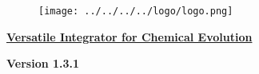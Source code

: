 
\begin{center}
\begin{figure}[!h]
\centering
\texttt{[image: ../../../../logo/logo.png]}
\end{figure}
\underline{\LARGE \textbf{Versatile Integrator for Chemical Evolution}}
\par
{\Large \textbf{Version 1.3.1}}
\end{center}
